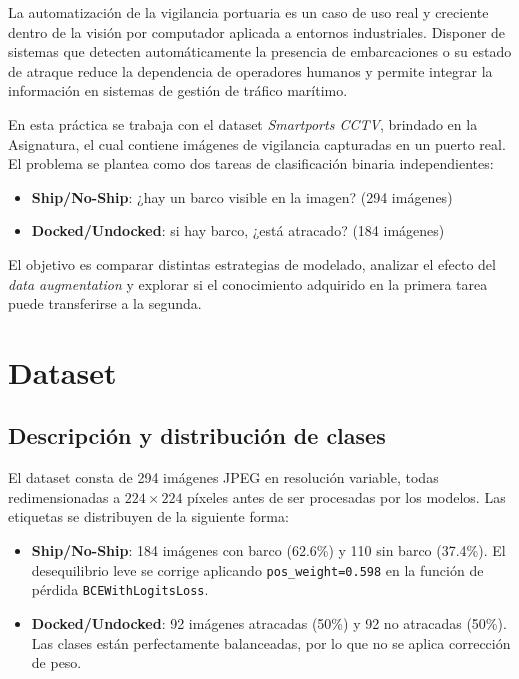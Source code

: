 \documentclass[11pt, a4paper]{article}
\begin{document}
La automatización de la vigilancia portuaria es un caso de uso real y creciente
dentro de la visión por computador aplicada a entornos industriales. Disponer de
sistemas que detecten automáticamente la presencia de embarcaciones o su estado
de atraque reduce la dependencia de operadores humanos y permite integrar la
información en sistemas de gestión de tráfico marítimo.

En esta práctica se trabaja con el dataset \textit{Smartports CCTV}, brindado en la Asignatura, el cual contiene
imágenes de vigilancia capturadas en un puerto real. El problema se plantea como
dos tareas de clasificación binaria independientes:

\begin{itemize}
    \item \textbf{Ship/No-Ship}: ¿hay un barco visible en la imagen? (294 imágenes)
    \item \textbf{Docked/Undocked}: si hay barco, ¿está atracado? (184 imágenes)
\end{itemize}

El objetivo es comparar distintas estrategias de modelado, analizar el efecto
del \textit{data augmentation} y explorar si el conocimiento adquirido en la
primera tarea puede transferirse a la segunda.

\section{Dataset}

\subsection{Descripción y distribución de clases}

El dataset consta de 294 imágenes JPEG en resolución variable, todas
redimensionadas a $224 \times 224$ píxeles antes de ser procesadas por los
modelos. Las etiquetas se distribuyen de la siguiente forma:

\begin{itemize}
    \item \textbf{Ship/No-Ship}: 184 imágenes con barco (62.6\%) y 110 sin barco
          (37.4\%). El desequilibrio leve se corrige aplicando
          \texttt{pos\_weight=0.598} en la función de pérdida
          \texttt{BCEWithLogitsLoss}.
    \item \textbf{Docked/Undocked}: 92 imágenes atracadas (50\%) y 92 no atracadas
          (50\%). Las clases están perfectamente balanceadas, por lo que no se
          aplica corrección de peso.
\end{itemize}
\end{document}
